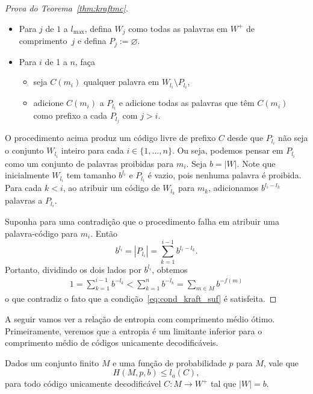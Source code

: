 \begin{proof}[Prova do Teorema~\ref{thm:kraftmc}]
\begin{itemize}
  \item Para $j$ de $1$ a $l_{\max}$, defina $W_j$ como todas as
    palavras em $W^+$ de comprimento~$j$ e defina $P_j :=
    \varnothing$.
  \item Para $i$ de 1 a $n$, faça
    \begin{itemize}
    \item seja $C(m_i)$ qualquer palavra em $W_{l_i}\setminus P_{l_i}$,
    \item adicione $C(m_i)$ a $P_{l_i}$ e adicione todas as palavras que
      têm $C(m_i)$ como prefixo a cada $P_{l_j}$ com $j>i$.
    \end{itemize}
\end{itemize}

O procedimento acima produz um código livre de prefixo $C$ desde que
$P_{l_i}$ não seja o conjunto $W_{l_i}$ inteiro para cada
$i\in\{1,\dotsc,n\}$. Ou seja, podemos pensar em $P_{l_i}$ como um
conjunto de palavras proibidas para $m_i$. Seja $b = |W|$. Note que
inicialmente $W_{l_i}$ tem tamanho $b^{l_i}$ e $P_{l_i}$ é vazio, pois
nenhuma palavra é proibida.  Para cada $k<i$, ao atribuir um código de
$W_{l_{k}}$ para $m_k$, adicionamos $b^{l_i - l_k}$ palavras a
$P_{l_i}$.

Suponha para uma contradição que o procedimento falha em atribuir uma
palavra-código para $m_i$. Então
\begin{equation*}
b^{l_i} = |P_{l_i}| = \sum_{k=1}^{i-1} b^{l_i - l_k}.
\end{equation*}
Portanto, dividindo os dois lados por $b^{l_i}$, obtemos
\begin{align*}
  1 = \sum_{k=1}^{i-1} b^{- l_k} <  \sum_{k=1}^{n} b^{- l_k} = \sum_{m\in M} b^{-f(m)}
\end{align*}
o que contradiz o fato que a condição~\eqref{eq:cond_kraft_suf} é satisfeita.
\end{proof}

A seguir vamos ver a relação de entropia com comprimento médio
ótimo. Primeiramente, veremos que a entropia é um limitante inferior
para o comprimento médio de códigos unicamente decodificáveis.

\begin{lemma}
  \label{lem:entropia_inf}
  Dados um conjunto finito $M$ e uma função de probabilidade $p$ para
  $M$, vale que
\begin{equation*}
  H(M, p, b) \leq l_a(C),
\end{equation*}
para todo código unicamente decodificável $C:M\to W^+$ tal que $|W| =
b$.
\end{lemma}


